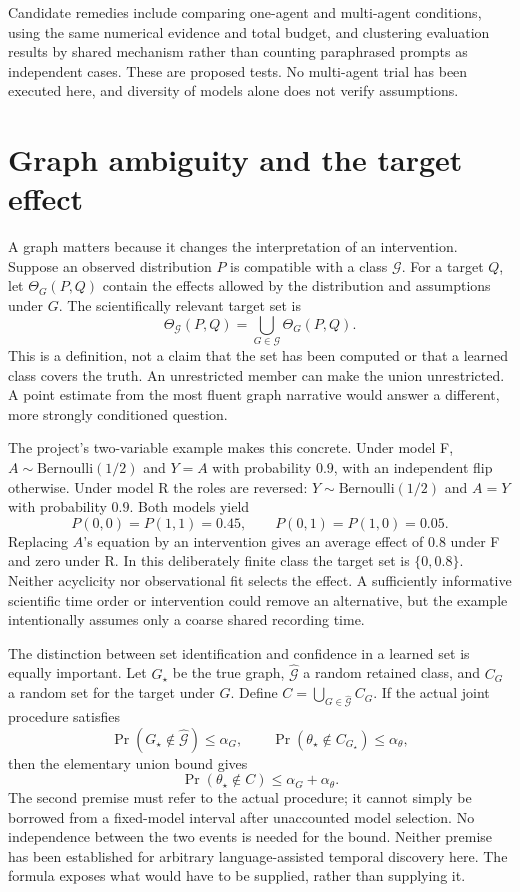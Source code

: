 Candidate remedies include comparing one-agent and multi-agent conditions,
using the same numerical evidence and total budget, and clustering evaluation
results by shared mechanism rather than counting paraphrased prompts as
independent cases. These are proposed tests. No multi-agent trial has been
executed here, and diversity of models alone does not verify assumptions.

\section{Graph ambiguity and the target effect}

A graph matters because it changes the interpretation of an intervention.
Suppose an observed distribution $P$ is compatible with a class
$\mathcal G$. For a target $Q$, let $\Theta_G(P,Q)$ contain the effects
allowed by the distribution and assumptions under $G$. The scientifically
relevant target set is
\begin{equation}
 \Theta_{\mathcal G}(P,Q)=\bigcup_{G\in\mathcal G}\Theta_G(P,Q).
 \label{eq:la03-effect-union}
\end{equation}
This is a definition, not a claim that the set has been computed or that a
learned class covers the truth. An unrestricted member can make the union
unrestricted. A point estimate from the most fluent graph narrative would
answer a different, more strongly conditioned question.

The project's two-variable example makes this concrete. Under model F,
$A\sim\mathrm{Bernoulli}(1/2)$ and $Y=A$ with probability $0.9$, with an
independent flip otherwise. Under model R the roles are reversed:
$Y\sim\mathrm{Bernoulli}(1/2)$ and $A=Y$ with probability $0.9$. Both
models yield
\[
 P(0,0)=P(1,1)=0.45,\qquad P(0,1)=P(1,0)=0.05.
\]
Replacing $A$'s equation by an intervention gives an average effect of $0.8$
under F and zero under R. In this deliberately finite class the target set is
$\{0,0.8\}$. Neither acyclicity nor observational fit selects the effect.
A sufficiently informative scientific time order or intervention could remove
an alternative, but the example intentionally assumes only a coarse shared
recording time.

The distinction between set identification and confidence in a learned set is
equally important. Let $G_\star$ be the true graph, $\widehat{\mathcal G}$ a
random retained class, and $C_G$ a random set for the target under $G$. Define
$C=\bigcup_{G\in\widehat{\mathcal G}}C_G$. If the actual joint procedure
satisfies
\[
 \Pr(G_\star\notin\widehat{\mathcal G})\le\alpha_G,
 \qquad
 \Pr(\theta_\star\notin C_{G_\star})\le\alpha_\theta,
\]
then the elementary union bound gives
\begin{equation}
 \Pr(\theta_\star\notin C)\le\alpha_G+\alpha_\theta.
 \label{eq:la03-coverage-decomposition}
\end{equation}
The second premise must refer to the actual procedure; it cannot simply be
borrowed from a fixed-model interval after unaccounted model selection. No
independence between the two events is needed for the bound. Neither premise
has been established for arbitrary language-assisted temporal discovery here.
The formula exposes what would have to be supplied, rather than supplying it.

